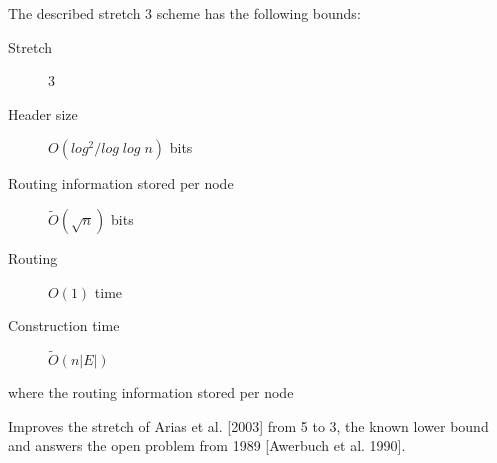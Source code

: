 The described stretch 3 scheme has the following bounds:
\begin{description}
    \item[Stretch] 3
    \item[Header size] $O(log^2/log\;log\;n)$ bits
    \item[Routing information stored per node] $\tilde{O}(\sqrt{n})$ bits
    \item[Routing] $O(1)$ time
    \item[Construction time] $\tilde{O}(n|E|)$
\end{description}
where the routing information stored per node 

Improves the stretch of Arias et al. [2003] from 5 to 3, the known lower bound and answers the open problem from 1989 [Awerbuch et al. 1990].
